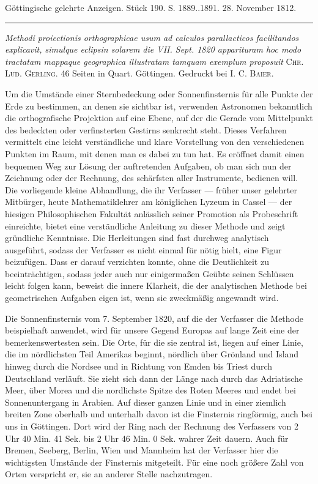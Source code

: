 \clearpage
{}
\hypertarget{native-547-lower}{}\label{native-547-lower}
\begin{center}\small Göttingische gelehrte Anzeigen. Stück 190. S. 1889..1891. 28. November 1812.\\[3pt]\rule{.72\linewidth}{.3pt}\end{center}

\emph{Methodi proiectionis orthographicae usum ad calculos parallacticos facilitandos explicavit, simulque eclipsin solarem die VII. Sept. \textup{1820} apparituram hoc modo tractatam mappaque geographica illustratam tamquam exemplum proposuit} \textsc{Chr. Lud. Gerling}. 46 Seiten in Quart. Göttingen. Gedruckt bei \textsc{I. C. Baier}.

Um die Umstände einer Sternbedeckung oder Sonnenfinsternis für alle Punkte der Erde zu bestimmen, an denen sie sichtbar ist, verwenden Astronomen bekanntlich die orthografische Projektion auf eine Ebene, auf der die Gerade vom Mittelpunkt des bedeckten oder verfinsterten Gestirns senkrecht steht. Dieses Verfahren vermittelt eine leicht verständliche und klare Vorstellung von den verschiedenen Punkten im Raum, mit denen man es dabei zu tun hat. Es eröffnet damit einen bequemen Weg zur Lösung der auftretenden Aufgaben, ob man sich nun der Zeichnung oder der Rechnung, des schärfsten aller Instrumente, bedienen will. Die vorliegende kleine Abhandlung, die ihr Verfasser --- früher unser gelehrter Mitbürger, heute Mathematiklehrer am königlichen Lyzeum in Cassel --- der hiesigen Philosophischen Fakultät anlässlich seiner Promotion als Probeschrift einreichte, bietet eine verständliche Anleitung zu dieser Methode und zeigt gründliche Kenntnisse. Die Herleitungen sind fast durchweg analytisch ausgeführt, sodass der Verfasser es nicht einmal für nötig hielt, eine Figur beizufügen. Dass er darauf verzichten konnte, ohne die Deutlichkeit zu beeinträchtigen, sodass jeder auch nur einigermaßen Geübte seinen Schlüssen leicht folgen kann, beweist die innere Klarheit, die der analytischen Methode bei geometrischen Aufgaben eigen ist, wenn sie zweckmäßig angewandt wird.

Die Sonnenfinsternis vom 7. September 1820, auf die der Verfasser die Methode beispielhaft anwendet, wird für unsere Gegend Europas auf lange Zeit eine der bemerkenswertesten sein. Die Orte, für die sie zentral ist, liegen auf einer Linie, die im nördlichsten Teil Amerikas beginnt, nördlich über Grönland und Island hinweg durch die Nordsee und in Richtung von Emden bis Triest durch Deutschland verläuft. Sie zieht sich dann der Länge nach durch das Adriatische Meer, über Morea und die nordlichste Spitze des Roten Meeres und endet bei Sonnenuntergang in Arabien. Auf dieser ganzen Linie und in einer ziemlich breiten Zone oberhalb und unterhalb davon ist die Finsternis ringförmig, auch bei uns in Göttingen. Dort wird der Ring nach der Rechnung des Verfassers von 2 Uhr 40 Min. 41 Sek. bis 2 Uhr 46 Min. 0 Sek. wahrer Zeit dauern. Auch für Bremen, Seeberg, Berlin, Wien und Mannheim hat der Verfasser hier die wichtigsten Umstände der Finsternis mitgeteilt. Für eine noch größere Zahl von Orten verspricht er, sie an anderer Stelle nachzutragen.
